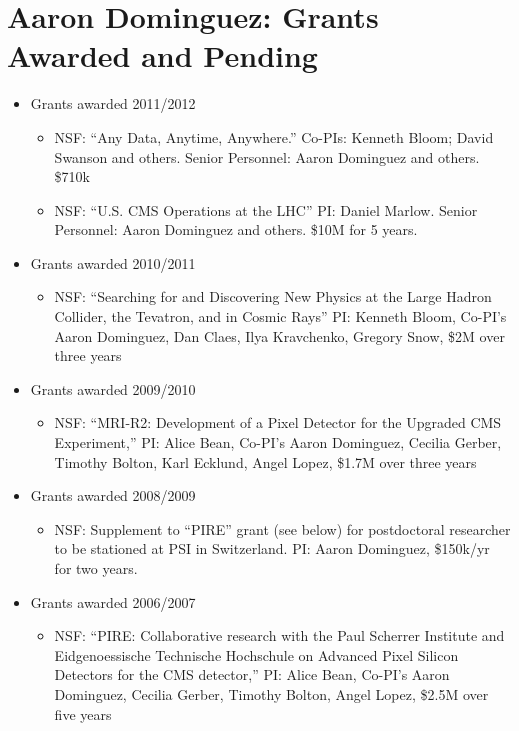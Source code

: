 \documentclass[11pt]{article}
\begin{document}
\section*{Aaron Dominguez: Grants Awarded and Pending}
\begin{itemize}
\item Grants awarded 2011/2012
  \begin{itemize}
  \item NSF: ``Any Data, Anytime, Anywhere.'' Co-PIs: Kenneth Bloom;
    David Swanson and others. Senior Personnel: Aaron Dominguez and
    others. \$710k
  \item NSF: ``U.S. CMS Operations at the LHC'' PI: Daniel Marlow.
    Senior Personnel: Aaron Dominguez and others.  \$10M for 5 years.
  \end{itemize}
\item Grants awarded 2010/2011
  \begin{itemize}
  \item NSF: ``Searching for and Discovering New Physics at the Large
    Hadron Collider, the Tevatron, and in Cosmic Rays'' PI: Kenneth
    Bloom, Co-PI's Aaron Dominguez, Dan Claes, Ilya Kravchenko,
    Gregory Snow, \$2M over three years
  \end{itemize}
\item Grants awarded 2009/2010
  \begin{itemize}
  \item NSF: ``MRI-R2: Development of a Pixel Detector for the
    Upgraded CMS Experiment,'' PI: Alice Bean, Co-PI's Aaron
    Dominguez, Cecilia Gerber, Timothy Bolton, Karl Ecklund, Angel
    Lopez, \$1.7M over three years
  \end{itemize}
\item Grants awarded 2008/2009
  \begin{itemize}
  \item NSF: Supplement to ``PIRE'' grant (see below) for postdoctoral
    researcher to be stationed at PSI in Switzerland. PI: Aaron
    Dominguez, \$150k/yr for two years.
  \end{itemize}
\item Grants awarded 2006/2007
  \begin{itemize}
  \item NSF: ``PIRE: Collaborative research with the Paul Scherrer
    Institute and Eidgenoessische Technische Hochschule on Advanced
    Pixel Silicon Detectors for the CMS detector,'' PI: Alice Bean,
    Co-PI's Aaron Dominguez, Cecilia Gerber, Timothy Bolton, Angel
    Lopez, \$2.5M over five years

\end{itemize}
\end{itemize}
\end{document}
